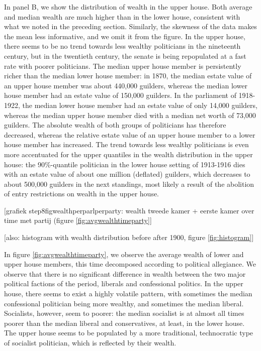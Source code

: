     In panel B, we show the distribution of wealth in the upper house. Both average and median wealth are much higher than in the lower house, consistent with what we noted in the preceding section. Similarly, the skewness of the data makes the mean less informative, and we omit it from the figure. In the upper house, there seems to be no trend towards less wealthy politicians in the nineteenth century, but in the twentieth century, the senate is being repopulated at a fast rate with poorer politicians. The median upper house member is persistently richer than the median lower house member: in 1870, the median estate value of an upper house member was about 440,000 guilders, whereas the median lower house member had an estate value of 150,000 guilders. In the parliament of 1918-1922, the median lower house member had an estate value of only 14,000 guilders, whereas the median upper house member died with a median net worth of 73,000 guilders. The absolute wealth of both groups of politicians has therefore decreased, whereas the relative estate value of an upper house member to a lower house member has increased. The trend towards less wealthy politicians is even more accentuated for the upper quantiles in the wealth distribution in the upper house: the 90\%-quantile politician in the lower house setting of 1913-1916 dies with an estate value of about one million (deflated) guilders, which decreases to about 500,000 guilders in the next standings, most likely a result of the abolition of entry restrictions on wealth in the upper house. 
    
    \begin{center}
        [grafiek step8figwealthperparlperparty: wealth tweede kamer + eerste kamer over time met partij (figure \ref{fig:avgwealthtimeparty}]
        
        [also: histogram with wealth distribution before after 1900, figure \ref{fig:histogram}]
    \end{center}
    
    In figure \ref{fig:avgwealthtimeparty}, we observe the average wealth of lower and upper house members, this time decomposed according to political allegiance. We observe that there is no significant difference in wealth between the two major political factions of the period, liberals and confessional politics. In the upper house, there seems to exist a highly volatile pattern, with sometimes the median confessional politician being more wealthy, and sometimes the median liberal. Socialists, however, seem to poorer: the median socialist is at almost all times poorer than the median liberal and conservatives, at least, in the lower house. The upper house seems to be populated by a more traditional, technocratic type of socialist politician, which is reflected by their wealth. 
    
